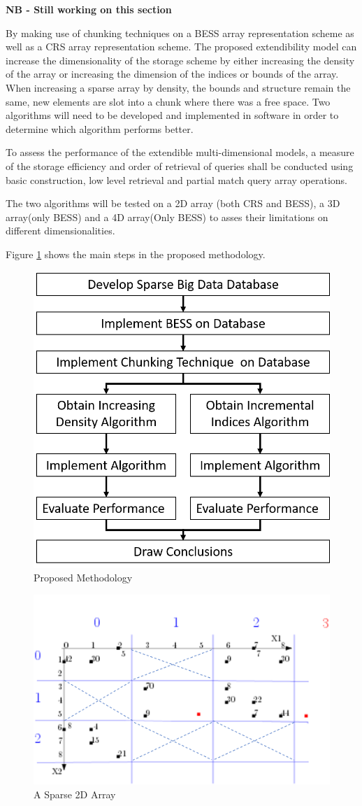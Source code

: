 \textbf{NB - Still working on this section}

 By making use of chunking techniques on a BESS array representation scheme as well as a CRS array representation scheme. The proposed extendibility model can increase the dimensionality of the storage scheme by either increasing the density of the array or increasing the dimension  of the indices or bounds of the array. When increasing a sparse array by density, the bounds and structure remain the same, new elements are slot into a chunk where there was a free space. Two algorithms will need to be developed and implemented in software in order to determine which algorithm performs better.
 
 To assess the performance of the extendible multi-dimensional models, a measure of the storage efficiency and order of retrieval of queries shall be conducted using basic construction, low level retrieval and partial match query array operations.
 
 The two algorithms will be tested on a 2D array (both CRS and BESS), a 3D array(only BESS) and a 4D array(Only BESS) to asses their limitations on different dimensionalities.
 
 Figure \ref{fig:proposedmethod} shows the main steps in the proposed methodology.

 
 \begin{figure}[H]
 	\centering
 	\includegraphics[width=0.7\linewidth]{proposedMethod}
 	\caption{Proposed Methodology}
 	\label{fig:proposedmethod}
 \end{figure}
 

 \begin{figure}[H]
	\centering
	\includegraphics[width=0.7\linewidth]{methodExampleCrossed}
	\caption{A Sparse 2D Array}
	\label{fig:examplemethod}
\end{figure}